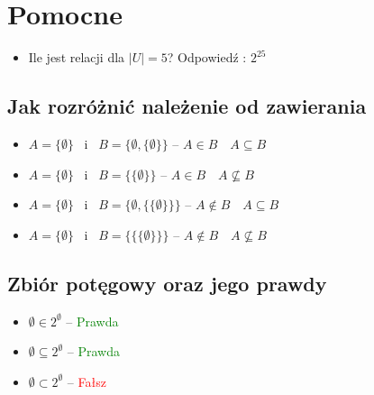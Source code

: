 \section{Pomocne}

\begin{itemize}
    \item Ile jest relacji dla $ |U| = 5 $? Odpowiedź : $ 2^{25} $
\end{itemize}

\subsection{Jak rozróżnić należenie od zawierania}

\begin{itemize}
    \item $ A = \{ \emptyset \} $ \ i \ $ B = \{ \emptyset, \{ \emptyset \} \} $ -- $ A \in B \quad A \subseteq B$
    \item $ A = \{ \emptyset \} $ \ i \ $ B = \{\{\emptyset\}\}$ -- $ A \in B \quad A \nsubseteq B $
    \item $ A = \{ \emptyset \} $ \ i \ $ B = \{ \emptyset, \{ \{ \emptyset \} \} \} $ -- $ A \notin B \quad A \subseteq B $
    \item $ A = \{ \emptyset \} $ \ i \ $ B = \{\{\{ \emptyset \}\}\} $ -- $ A \notin B \quad A \nsubseteq B $
\end{itemize}

\subsection{Zbiór potęgowy oraz jego prawdy}

\begin{itemize}
    \item $ \emptyset \in 2^{\emptyset} $ -- \textcolor{Green}{Prawda}
    \item $ \emptyset \subseteq 2^{\emptyset} $ -- \textcolor{Green}{Prawda}
    \item $ \emptyset \subset 2^{\emptyset} $ -- \textcolor{red}{Fałsz}
\end{itemize}